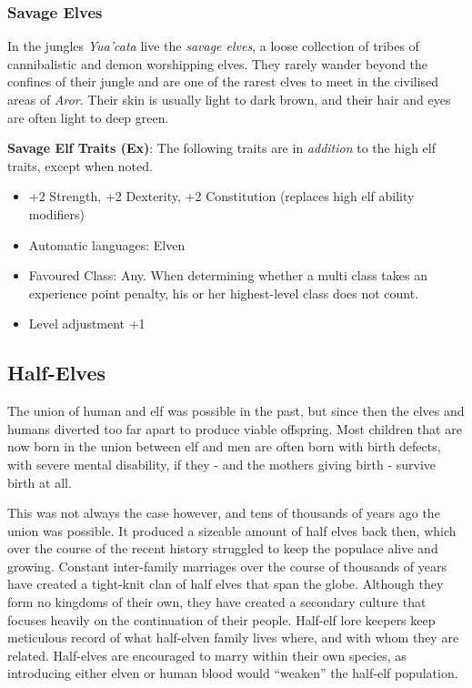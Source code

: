 \subsubsection*{Savage Elves}

In the jungles \emph{Yua'cata} live the \emph{savage elves}, a loose
collection of tribes of cannibalistic and demon worshipping elves. They rarely
wander beyond the confines of their jungle and are one of the rarest elves to
meet in the civilised areas of \emph{Aror}. Their skin is usually light to dark
brown, and their hair and eyes are often light to deep green.

\begin{35e}
  \textbf{Savage Elf Traits (Ex)}: The following traits are in \emph{addition}
  to the high elf traits, except when noted.
  \begin{itemize}[noitemsep]
    \item +2 Strength, +2 Dexterity, +2 Constitution (replaces high elf ability
    modifiers)
    \item Automatic languages: Elven
    \item Favoured Class: Any. When determining whether a multi class takes an
    experience point penalty, his or her highest-level class does not count.
    \item Level adjustment +1
  \end{itemize}
\end{35e}

\subsection*{Half-Elves}

The union of human and elf was possible in the past, but since then the elves
and humans diverted too far apart to produce viable offspring. Most children
that are now born in the union between elf and men are often born with birth
defects, with severe mental disability, if they - and the mothers giving
birth - survive birth at all.

This was not always the case however, and tens of thousands of years ago the
union was possible. It produced a sizeable amount of half elves back then,
which over the course of the recent history struggled to keep the populace
alive and growing. Constant inter-family marriages over the course of
thousands of years have created a tight-knit clan of half elves that span the
globe. Although they form no kingdoms of their own, they have created a
secondary culture that focuses heavily on the continuation of their
people. Half-elf lore keepers keep meticulous record of what half-elven family
lives where, and with whom they are related. Half-elves are encouraged to
marry within their own species, as introducing either elven or human blood
would ``weaken'' the half-elf population.

